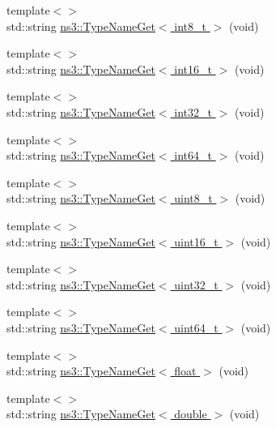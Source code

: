 \begin{DoxyCompactItemize}
\item 
{\footnotesize template$<$$>$ }\\std\+::string \hyperlink{group__attributeimpl_gaf2000b8baeaaa56a818ea1b3e707542e}{ns3\+::\+Type\+Name\+Get$<$ int8\+\_\+t $>$} (void)
\item 
{\footnotesize template$<$$>$ }\\std\+::string \hyperlink{group__attributeimpl_gaa497aafbaa514d27fb1c8a44723eab25}{ns3\+::\+Type\+Name\+Get$<$ int16\+\_\+t $>$} (void)
\item 
{\footnotesize template$<$$>$ }\\std\+::string \hyperlink{group__attributeimpl_gaa80c01003e8f97a13ce91964d0657bf8}{ns3\+::\+Type\+Name\+Get$<$ int32\+\_\+t $>$} (void)
\item 
{\footnotesize template$<$$>$ }\\std\+::string \hyperlink{group__attributeimpl_gabce9a2b4cd9746a9f2367a15a2446fae}{ns3\+::\+Type\+Name\+Get$<$ int64\+\_\+t $>$} (void)
\item 
{\footnotesize template$<$$>$ }\\std\+::string \hyperlink{group__attributeimpl_ga5d93dfb7262b2958de81883d1289c2ee}{ns3\+::\+Type\+Name\+Get$<$ uint8\+\_\+t $>$} (void)
\item 
{\footnotesize template$<$$>$ }\\std\+::string \hyperlink{group__attributeimpl_gad3a57d52e5dc9eb143cf9365ba4a3654}{ns3\+::\+Type\+Name\+Get$<$ uint16\+\_\+t $>$} (void)
\item 
{\footnotesize template$<$$>$ }\\std\+::string \hyperlink{group__attributeimpl_ga43f5f8c28d59d17ce8cbb9aaef6440fb}{ns3\+::\+Type\+Name\+Get$<$ uint32\+\_\+t $>$} (void)
\item 
{\footnotesize template$<$$>$ }\\std\+::string \hyperlink{group__attributeimpl_ga25468dd5b76562e1b359af6342b78f59}{ns3\+::\+Type\+Name\+Get$<$ uint64\+\_\+t $>$} (void)
\item 
{\footnotesize template$<$$>$ }\\std\+::string \hyperlink{group__attributeimpl_ga3161e1f308c7602aa2787fcbbef096fe}{ns3\+::\+Type\+Name\+Get$<$ float $>$} (void)
\item 
{\footnotesize template$<$$>$ }\\std\+::string \hyperlink{group__attributeimpl_gacddf452951d93d7419c247082fc18764}{ns3\+::\+Type\+Name\+Get$<$ double $>$} (void)
\end{DoxyCompactItemize}


